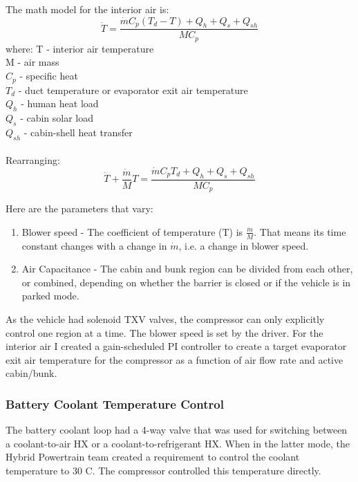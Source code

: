 The math model for the interior air is:
\begin{equation}
\dot{T} = \frac{\dot{m} C_p (T_d - T) + Q_h + Q_s + Q_{sh}}{MC_p}
\end{equation}
\newline
where:
\newline
T - interior air temperature \\
M - air mass \\
\(C_p\) - specific heat \\
\(T_d\) - duct temperature or evaporator exit air temperature \\
\(Q_h\) - human heat load \\
\(Q_s\) - cabin solar load \\
\(Q_{sh}\) - cabin-shell heat transfer \\
\\
Rearranging:
\begin{equation}
\dot{T} + \frac{\dot{m}}{M} T = \frac{\dot{m} C_p T_d + Q_h + Q_s + Q_{sh}}{MC_p}
\end{equation}

\noindent
Here are the parameters that vary:
\begin{enumerate}
  \item Blower speed - The coefficient of temperature (T) is \(\frac{\dot{m}}{M}\). That means its time constant changes with a change in \(\dot{m}\), i.e. a change in blower speed. 
  \item Air Capacitance - The cabin and bunk region can be divided from each other, or combined, depending on whether the barrier is closed or if the vehicle is in parked mode.
\end{enumerate}

\noindent
As the vehicle had solenoid TXV valves, the compressor can only explicitly control one region at a time. The blower speed is set by the driver. For the interior air I created a gain-scheduled PI controller to create a target evaporator exit air temperature for the compressor as a function of air flow rate and active cabin/bunk.

\subsubsection * {Battery Coolant Temperature Control}
The battery coolant loop had a 4-way valve that was used for switching between a coolant-to-air HX or a coolant-to-refrigerant HX. When in the latter mode, the Hybrid Powertrain team created a requirement to control the coolant temperature to 30 \textdegree C. The compressor controlled this temperature directly.

